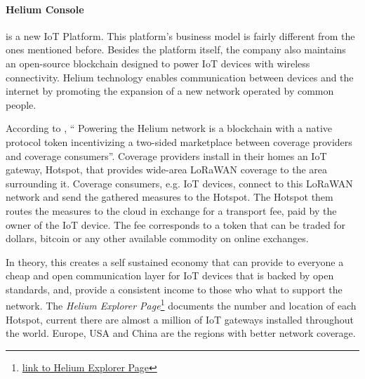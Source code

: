 


\paragraph{Helium Console}
\label{par:stateofart:arch:infra:middleware:helium}

 is a new \gls{IoT} Platform. This platform's business model is fairly different from the ones mentioned before. Besides the platform itself, the company also maintains an open-source blockchain designed to power \gls{IoT} devices with wireless connectivity. Helium technology enables communication between devices and the internet by promoting the expansion of a new network operated by common people.

According to \cite{helium-wp}, `` Powering the Helium network is a blockchain with a native protocol token incentivizing a two-sided marketplace between coverage providers and coverage consumers''. Coverage providers install in their homes an \gls{IoT} gateway, Hotspot, that provides wide-area LoRaWAN coverage to the area surrounding it. Coverage consumers, e.g. \gls{IoT} devices, connect to this LoRaWAN network and send the gathered measures to the Hotspot. The Hotspot them routes the measures to the cloud in exchange for a transport fee, paid by the owner of the \gls{IoT} device.
The fee corresponds to a token that can be traded for dollars, bitcoin or any other available commodity on online exchanges.

In theory, this creates a self sustained economy that can provide to everyone a cheap and open communication layer for \gls{IoT} devices that is backed by open standards, and, provide a consistent income to those who what to support the network. The \textit{Helium Explorer Page}\footnote{\href {https://explorer.helium.com/}{link to Helium Explorer Page}} documents the number and location of each Hotspot, current there are almost a million of \gls{IoT} gateways installed throughout the world. Europe, USA and China are the regions with better network coverage.

